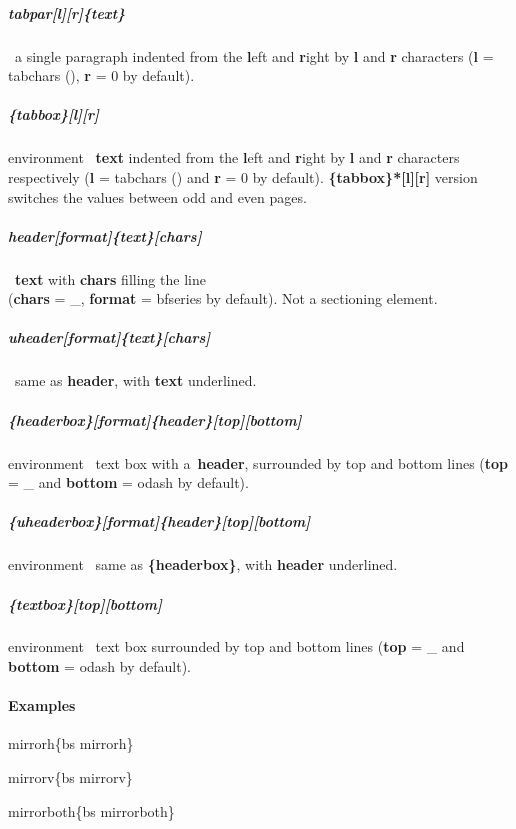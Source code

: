 \documentclass[english,12pt,openany,letterpaper]{book}
\begin{document}
\skipline

\subparagraph{\bs tabpar[l][r]\{text\}} \dash\ a single paragraph indented from the \textbf{l}eft and \textbf{r}ight by \textbf{l} and \textbf{r} characters (\textbf{l} = \bs tabchars (\tabchars), \textbf{r} = 0 by default).

\subparagraph{\{tabbox\}[l][r]} environment \dash\ \textbf{text} indented from the \textbf{l}eft and \textbf{r}ight by \textbf{l} and \textbf{r} characters respectively (\textbf{l} = \bs tabchars (\tabchars) and \textbf{r} = 0 by default). \textbf{\{tabbox\}*[l][r]} version switches the values between odd and even pages.

\skipline

\subparagraph{\bs header[format]\{text\}[chars]} \dash\ \textbf{text} with \textbf{chars} filling the line
\\(\textbf{chars} = \bs\_, \textbf{format} = \bs bfseries by default). Not a sectioning element.

\subparagraph{\bs uheader[format]\{text\}[chars]} \dash\ same as \textbf{\bs header}, with \textbf{text} underlined.

\skipline

\subparagraph{\{headerbox\}[format]\{header\}[top][bottom]} environment \dash\ text box with a~\textbf{header}, surrounded by top and bottom lines (\textbf{top} = \bs\_ and \textbf{bottom} = \bs odash by default).

\subparagraph{\{uheaderbox\}[format]\{header\}[top][bottom]} environment \dash\ same as \textbf{\{headerbox\}}, with \textbf{header} underlined.

\skipline

\subparagraph{\{textbox\}[top][bottom]} environment \dash\ text box surrounded by top and bottom lines (\textbf{top} = \bs\_ and \textbf{bottom} = \bs odash by default).

\break

\paragraph{Examples}


 \tab \bs mirrorh\{\bs bs mirrorh\}

 \tab \bs mirrorv\{\bs bs mirrorv\}

 \bs mirrorboth\{\bs bs mirrorboth\}

\skipline
\end{document}
